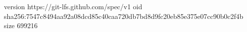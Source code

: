version https://git-lfs.github.com/spec/v1
oid sha256:7547c8494aa92a08dcd85c40caa720db7bd8d9fc20eb85e375e07cc90b0c2f4b
size 699216
